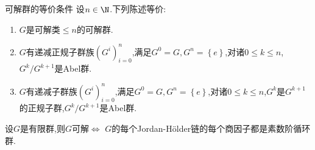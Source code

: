 \begin{proposition}{可解群的等价条件}{}
	设$n\in\N$.下列陈述等价:
	\begin{enumerate}
		\item $G$是可解类$\leq n$的可解群.
		\item $G$有递减正规子群族$\left(G^{i}\right)_{i=0}^{n}$,满足$G^{0}=G,G^{n}=\left\{e\right\}$,对诸$0\leq k\leq n$,$G^{k}/G^{k+1}$是Abel群.
		\item $G$有递减子群族$\left(G^{i}\right)_{i=0}^{n}$,满足$G^{0}=G,G^{n}=\left\{e\right\}$,对诸$0\leq k\leq n$,$G^{k}$是$G^{k+1}$的正规子群,$G^{k}/G^{k+1}$是Abel群.
	\end{enumerate}
\end{proposition}

\begin{corollary}{}{}
	设$G$是有限群,则$G$可解$\iff$ $G$的每个Jordan-H\"older链的每个商因子都是素数阶循环群.
\end{corollary}















































































































